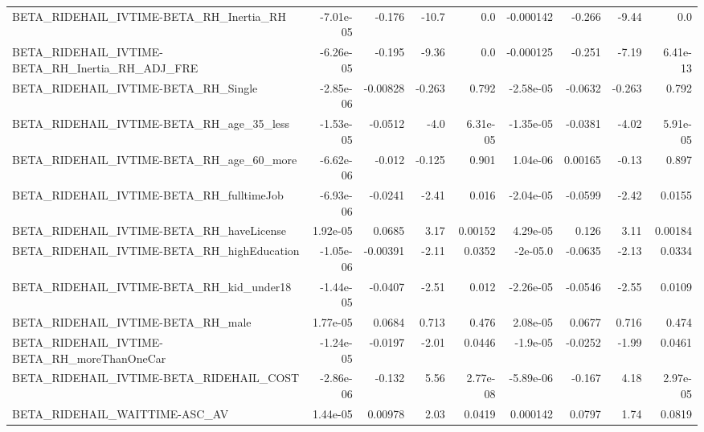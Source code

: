 \begin{tabular}{lrrrrrrrr}
BETA\_RIDEHAIL\_IVTIME-BETA\_RH\_Inertia\_RH            &   -7.01e-05 &       -0.176 &    -10.7 &      0.0 &  -0.000142 &      -0.266 &        -9.44 &           0.0 \\
BETA\_RIDEHAIL\_IVTIME-BETA\_RH\_Inertia\_RH\_ADJ\_FRE    &   -6.26e-05 &       -0.195 &    -9.36 &      0.0 &  -0.000125 &      -0.251 &        -7.19 &      6.41e-13 \\
BETA\_RIDEHAIL\_IVTIME-BETA\_RH\_Single                &   -2.85e-06 &     -0.00828 &   -0.263 &    0.792 &  -2.58e-05 &     -0.0632 &       -0.263 &         0.792 \\
BETA\_RIDEHAIL\_IVTIME-BETA\_RH\_age\_35\_less           &   -1.53e-05 &      -0.0512 &     -4.0 & 6.31e-05 &  -1.35e-05 &     -0.0381 &        -4.02 &      5.91e-05 \\
BETA\_RIDEHAIL\_IVTIME-BETA\_RH\_age\_60\_more           &   -6.62e-06 &       -0.012 &   -0.125 &    0.901 &   1.04e-06 &     0.00165 &        -0.13 &         0.897 \\
BETA\_RIDEHAIL\_IVTIME-BETA\_RH\_fulltimeJob           &   -6.93e-06 &      -0.0241 &    -2.41 &    0.016 &  -2.04e-05 &     -0.0599 &        -2.42 &        0.0155 \\
BETA\_RIDEHAIL\_IVTIME-BETA\_RH\_haveLicense           &    1.92e-05 &       0.0685 &     3.17 &  0.00152 &   4.29e-05 &       0.126 &         3.11 &       0.00184 \\
BETA\_RIDEHAIL\_IVTIME-BETA\_RH\_highEducation         &   -1.05e-06 &     -0.00391 &    -2.11 &   0.0352 &   -2e-05.0 &     -0.0635 &        -2.13 &        0.0334 \\
BETA\_RIDEHAIL\_IVTIME-BETA\_RH\_kid\_under18           &   -1.44e-05 &      -0.0407 &    -2.51 &    0.012 &  -2.26e-05 &     -0.0546 &        -2.55 &        0.0109 \\
BETA\_RIDEHAIL\_IVTIME-BETA\_RH\_male                  &    1.77e-05 &       0.0684 &    0.713 &    0.476 &   2.08e-05 &      0.0677 &        0.716 &         0.474 \\
BETA\_RIDEHAIL\_IVTIME-BETA\_RH\_moreThanOneCar        &   -1.24e-05 &      -0.0197 &    -2.01 &   0.0446 &   -1.9e-05 &     -0.0252 &        -1.99 &        0.0461 \\
BETA\_RIDEHAIL\_IVTIME-BETA\_RIDEHAIL\_COST            &   -2.86e-06 &       -0.132 &     5.56 & 2.77e-08 &  -5.89e-06 &      -0.167 &         4.18 &      2.97e-05 \\
BETA\_RIDEHAIL\_WAITTIME-ASC\_AV                      &    1.44e-05 &      0.00978 &     2.03 &   0.0419 &   0.000142 &      0.0797 &         1.74 &        0.0819 \\

\end{tabular}
